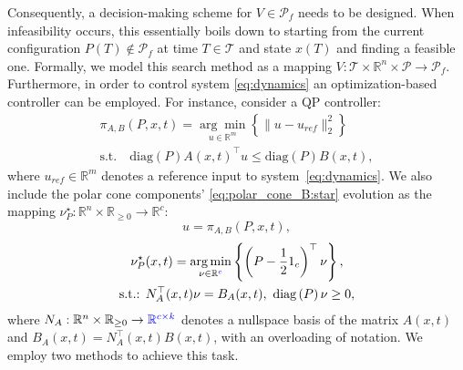 \documentclass[letterpaper, 10 pt, conference]{ieeeconf}  %
\begin{document}
\par 
Consequently, a decision-making scheme for $V\in\mathcal{P}_f$ needs to be designed. When infeasibility occurs, this essentially boils down to starting from the current configuration $P(T)\notin\mathcal{P}_f$ at time $T\in\mathcal{T}$ and state $x(T)$ and finding a feasible one. Formally, we model this search method as a mapping $V:\mathcal{T}\times \mathbb{R}^n \times \mathcal{P} \rightarrow \mathcal{P}_f$. Furthermore, in order to control system \eqref{eq:dynamics} an optimization-based controller can be employed. For instance, consider a QP controller:
    \begin{equation}\begin{gathered}
       \pi_{A,B}(P,x,t)  = \underset{u\in\mathbb{R}^m}{\arg\min}\left\{ \|u - u_{ref}\|_2^2 \right\}\\
        \textrm{s.t.} \quad \textrm{diag}(P)A(x,t)^\top u \leq\textrm{diag}(P)B(x,t),
        \label{eq:cbf-qp}
    \end{gathered}\end{equation}
where $u_{ref}\in\mathbb{R}^m$ denotes a reference input to system~\eqref{eq:dynamics}.
We also include the polar cone components' \eqref{eq:polar_cone_B:star} evolution as the mapping $\nu^\star_P:\mathbb{R}^n\times \mathbb{R}_{\geq 0}\rightarrow\mathbb{R}^c$:
\begin{equation}
    u = \pi_{A,B}(P,x,t),
\end{equation}
\begin{equation}\label{eq:polar_cone_B:star_time}
    \begin{gathered}
    \nu^\star_{P}(x,t)=  \underset{\nu\in\mathbb{R}{\color{blue}^c}}{\arg\min}\left\{\left( P - \frac{1}{2}{1}_c \right)^\top \nu \right\}, \\
    \textrm{s.t.: } N_{A}^\top (x,t)\nu = B_{A}(x,t), \ \textrm{diag}\left( P\right) \nu \geq 0,
    \end{gathered}   
\end{equation}
where $N_A : \mathbb{R}^n\times \mathbb{R}_{\geq 0}\rightarrow{\color{blue}\mathbb{R}^{c\times k}}$ denotes a nullspace basis of the matrix $A(x,t)$ and $B_A(x,t) = N^\top_A(x,t)B(x,t)$, with an overloading of notation. 
We employ two methods to achieve this task.
\end{document}
